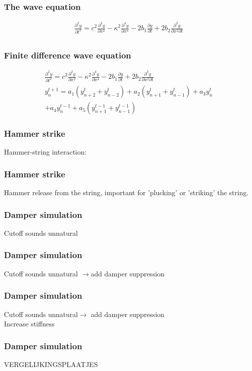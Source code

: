 \documentclass{beamer}
\begin{document}
\begin{frame}\frametitle{The wave equation}
	\begin{gather*}
	\frac{\partial^2 y}{\partial t^2} = c^2\frac{\partial^2 y}{\partial x^2}-\kappa^2\frac{\partial^4y}{\partial x^4}-2b_1\frac{\partial y}{\partial t} + 2b_2 \frac{\partial^3y}{\partial x^2\partial t}\\
\end{gather*}
\end{frame}

\begin{frame}\frametitle{Finite difference wave equation}
	\begin{gather*}
	\frac{\partial^2 y}{\partial t^2} = c^2\frac{\partial^2 y}{\partial x^2}-\kappa^2\frac{\partial^4y}{\partial x^4}-2b_1\frac{\partial y}{\partial t} + 2b_2 \frac{\partial^3y}{\partial x^2\partial t}\\
y_n^{t+1} = a_1\left(y_{n+2}^t+y_{n-2}^t\right)+a_2\left(y_{n+1}^t+y_{n-1}^t\right)+a_3y_n^t\\
+a_4y_n^{t-1}+a_5\left(y_{n+1}^{t-1}+y_{n-1}^{t-1}\right)
\end{gather*}
\end{frame}

\begin{frame}\frametitle{Hammer strike}
Hammer-string interaction:\\
\end{frame}

\begin{frame}\frametitle{Hammer strike}
Hammer release from the string, important for 'plucking' or 'striking' the string.
\end{frame}


\begin{frame}\frametitle{Damper simulation}
Cutoff sounds unnatural
\end{frame}

\begin{frame}\frametitle{Damper simulation}
Cutoff sounds unnatural $\rightarrow$add damper suppression
\end{frame}

\begin{frame}\frametitle{Damper simulation}
Cutoff sounds unnatural$\rightarrow$ add damper suppression\\
Increase stiffness
\end{frame}

\begin{frame}\frametitle{Damper simulation}
VERGELIJKINGSPLAATJES
\end{frame}
\end{document}
